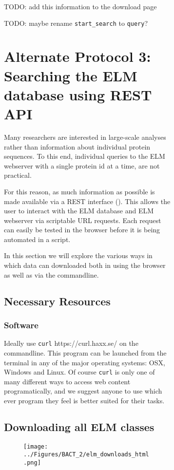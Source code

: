 {\begin{figure}[h!]
{{\begin{figure}[h!]
{{\begin{figure}[h!]
{}
\end{figure}
TODO: add this information to the download page

TODO: maybe rename \texttt{start\_search} to \texttt{query}?

\section{Alternate Protocol 3: Searching the ELM database using REST
API}\label{alternate-protocol-3-searching-the-elm-database-using-rest-api}

Many researchers are interested in large-scale analyses rather than
information about individual protein sequences. To this end, individual
queries to the ELM webserver with a single protein id at a time, are not
practical.

For this reason, as much information as possible is made available via a
REST interface (\cite{Fielding_2002}). This allows the user to interact
with the ELM database and ELM webserver via scriptable URL requests.
Each request can easily be tested in the browser before it is being
automated in a script.

In this section we will explore the various ways in which data can
downloaded both in using the browser as well as via the commandline.

\subsection{Necessary Resources}\label{necessary-resources-3}

\subsubsection{Software}\label{software-1}

Ideally use \texttt{curl} https://curl.haxx.se/ on the commandline. This
program can be launched from the terminal in any of the major operating
systems: OSX, Windows and Linux. Of course \texttt{curl} is only one of
many different ways to access web content programatically, and we
suggest anyone to use which ever program they feel is better suited for
their tasks.

\subsection{Downloading all ELM
classes}\label{downloading-all-elm-classes}

\begin{figure}[htbp]
\centering
\texttt{[image: ../Figures/BACT\_2/elm\_downloads\_html.png]}
\caption{
}
\end{figure}

}}
\end{figure}}}
\end{figure}}
